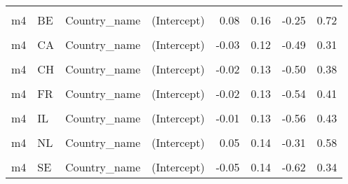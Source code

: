 \begin{table}
\begin{tabular}[t]{llllrrrr}
\cellcolor{gray!10}{m3.1} & \cellcolor{gray!10}{US} & \cellcolor{gray!10}{Country\_name} & \cellcolor{gray!10}{EPS} & \cellcolor{gray!10}{-0.06} & \cellcolor{gray!10}{0.07} & \cellcolor{gray!10}{-0.23} & \cellcolor{gray!10}{0.11}\\
m4 & BE & Country\_name & (Intercept) & 0.08 & 0.16 & -0.25 & 0.72\\
\cellcolor{gray!10}{m4} & \cellcolor{gray!10}{BE} & \cellcolor{gray!10}{Country\_name} & \cellcolor{gray!10}{EPS} & \cellcolor{gray!10}{0.14} & \cellcolor{gray!10}{0.08} & \cellcolor{gray!10}{-0.05} & \cellcolor{gray!10}{0.30}\\
m4 & CA & Country\_name & (Intercept) & -0.03 & 0.12 & -0.49 & 0.31\\
\cellcolor{gray!10}{m4} & \cellcolor{gray!10}{CA} & \cellcolor{gray!10}{Country\_name} & \cellcolor{gray!10}{EPS} & \cellcolor{gray!10}{-0.05} & \cellcolor{gray!10}{0.07} & \cellcolor{gray!10}{-0.21} & \cellcolor{gray!10}{0.10}\\
m4 & CH & Country\_name & (Intercept) & -0.02 & 0.13 & -0.50 & 0.38\\
\cellcolor{gray!10}{m4} & \cellcolor{gray!10}{CH} & \cellcolor{gray!10}{Country\_name} & \cellcolor{gray!10}{EPS} & \cellcolor{gray!10}{-0.04} & \cellcolor{gray!10}{0.06} & \cellcolor{gray!10}{-0.19} & \cellcolor{gray!10}{0.10}\\
m4 & FR & Country\_name & (Intercept) & -0.02 & 0.13 & -0.54 & 0.41\\
\cellcolor{gray!10}{m4} & \cellcolor{gray!10}{FR} & \cellcolor{gray!10}{Country\_name} & \cellcolor{gray!10}{EPS} & \cellcolor{gray!10}{-0.04} & \cellcolor{gray!10}{0.06} & \cellcolor{gray!10}{-0.20} & \cellcolor{gray!10}{0.10}\\
m4 & IL & Country\_name & (Intercept) & -0.01 & 0.13 & -0.56 & 0.43\\
\cellcolor{gray!10}{m4} & \cellcolor{gray!10}{IL} & \cellcolor{gray!10}{Country\_name} & \cellcolor{gray!10}{EPS} & \cellcolor{gray!10}{0.00} & \cellcolor{gray!10}{0.11} & \cellcolor{gray!10}{-0.29} & \cellcolor{gray!10}{0.26}\\
m4 & NL & Country\_name & (Intercept) & 0.05 & 0.14 & -0.31 & 0.58\\
\cellcolor{gray!10}{m4} & \cellcolor{gray!10}{NL} & \cellcolor{gray!10}{Country\_name} & \cellcolor{gray!10}{EPS} & \cellcolor{gray!10}{0.08} & \cellcolor{gray!10}{0.07} & \cellcolor{gray!10}{-0.08} & \cellcolor{gray!10}{0.24}\\
m4 & SE & Country\_name & (Intercept) & -0.05 & 0.14 & -0.62 & 0.34\\

\end{tabular}
\end{table}

